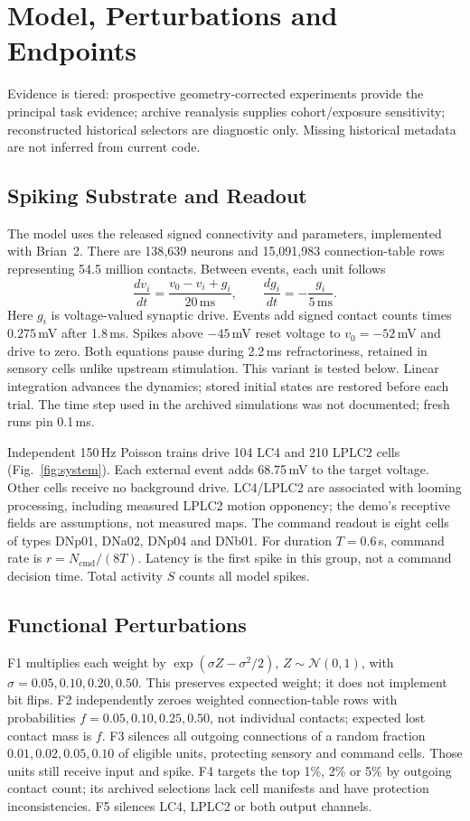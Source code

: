 \section{Model, Perturbations and Endpoints}
Evidence is tiered: prospective geometry-corrected experiments provide the principal task evidence; archive reanalysis supplies cohort/exposure sensitivity; reconstructed historical selectors are diagnostic only. Missing historical metadata are not inferred from current code.
\subsection{Spiking Substrate and Readout}
The model uses the released signed connectivity and parameters\cite{shiu2024drosophila}, implemented with Brian~2\cite{stimberg2019brian2}. There are 138{,}639 neurons and 15{,}091{,}983 connection-table rows representing 54.5 million contacts. Between events, each unit follows
\begin{equation}
\frac{dv_i}{dt}=\frac{v_0-v_i+g_i}{20\,\mathrm{ms}},
\qquad
\frac{dg_i}{dt}=-\frac{g_i}{5\,\mathrm{ms}} .
\end{equation}
Here $g_i$ is voltage-valued synaptic drive. Events add signed contact counts times $0.275$\,mV after 1.8\,ms. Spikes above $-45$\,mV reset voltage to $v_0=-52$\,mV and drive to zero. Both equations pause during 2.2\,ms refractoriness, retained in sensory cells unlike upstream stimulation. This variant is tested below. Linear integration advances the dynamics; stored initial states are restored before each trial. The time step used in the archived simulations was not documented; fresh runs pin 0.1\,ms.

Independent 150\,Hz Poisson trains drive 104 LC4 and 210 LPLC2 cells (Fig.~\ref{fig:system}). Each external event adds 68.75\,mV to the target voltage. Other cells receive no background drive. LC4/LPLC2 are associated with looming processing, including measured LPLC2 motion opponency\cite{klapoetke2017looming}; the demo's receptive fields are assumptions, not measured maps. The command readout is eight cells of types DNp01, DNa02, DNp04 and DNb01\cite{simpson2023descending}. For duration $T=0.6$\,s, command rate is $r=N_{\mathrm{cmd}}/(8T)$. Latency is the first spike in this group, not a command decision time. Total activity $S$ counts all model spikes.

\subsection{Functional Perturbations}
F1 multiplies each weight by $\exp(\sigma Z-\sigma^2/2)$, $Z\sim\mathcal N(0,1)$, with $\sigma=0.05,0.10,0.20,0.50$. This preserves expected weight; it does not implement bit flips. F2 independently zeroes weighted connection-table rows with probabilities $f=0.05,0.10,0.25,0.50$, not individual contacts; expected lost contact mass is $f$. F3 silences all outgoing connections of a random fraction $0.01,0.02,0.05,0.10$ of eligible units, protecting sensory and command cells. Those units still receive input and spike. F4 targets the top 1\%, 2\% or 5\% by outgoing contact count; its archived selections lack cell manifests and have protection inconsistencies. F5 silences LC4, LPLC2 or both output channels.

